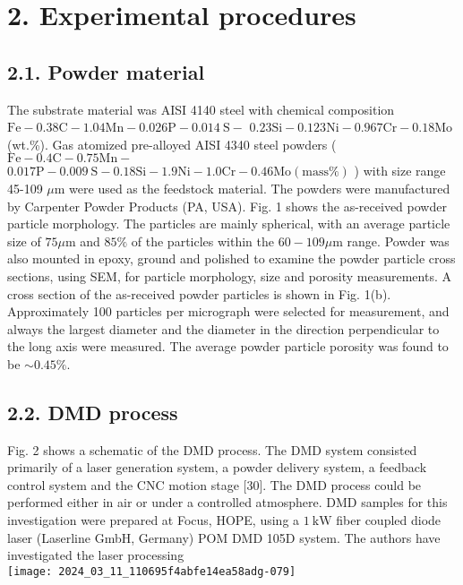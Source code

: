\documentclass[10pt]{article}
\begin{document}
\section*{2. Experimental procedures}
\subsection*{2.1. Powder material}
The substrate material was AISI 4140 steel with chemical composition $\mathrm{Fe}-0.38 \mathrm{C}-1.04 \mathrm{Mn}-0.026 \mathrm{P}-0.014 \mathrm{~S}-$ $0.23 \mathrm{Si}-0.123 \mathrm{Ni}-0.967 \mathrm{Cr}-0.18 \mathrm{Mo}$ (wt.\%). Gas atomized pre-alloyed AISI 4340 steel powders ( $\mathrm{Fe}-0.4 \mathrm{C}-0.75 \mathrm{Mn}-$ $0.017 \mathrm{P}-0.009 \mathrm{~S}-0.18 \mathrm{Si}-1.9 \mathrm{Ni}-1.0 \mathrm{Cr}-0.46 \mathrm{Mo}(\mathrm{mass} \%)$ ) with size range 45-109 $\mu \mathrm{m}$ were used as the feedstock material. The powders were manufactured by Carpenter Powder Products (PA, USA). Fig. 1 shows the as-received powder particle morphology. The particles are mainly spherical, with an average particle size of $75 \mu \mathrm{m}$ and $85 \%$ of the particles within the $60-109 \mu \mathrm{m}$ range. Powder was also mounted in epoxy, ground and polished to examine the powder particle cross sections, using SEM, for particle morphology, size and porosity measurements. A cross section of the as-received powder particles is shown in Fig. 1(b). Approximately 100 particles per micrograph were selected for measurement, and always the largest diameter and the diameter in the direction perpendicular to the long axis were measured. The average powder particle porosity was found to be $\sim 0.45 \%$.

\subsection*{2.2. DMD process}
Fig. 2 shows a schematic of the DMD process. The DMD system consisted primarily of a laser generation system, a powder delivery system, a feedback control system and the CNC motion stage [30]. The DMD process could be performed either in air or under a controlled atmosphere. DMD samples for this investigation were prepared at Focus, HOPE, using a $1 \mathrm{~kW}$ fiber coupled diode laser (Laserline GmbH, Germany) POM DMD 105D system. The authors have investigated the laser processing\\
\texttt{[image: 2024\_03\_11\_110695f4abfe14ea58adg-079]}
\end{document}
